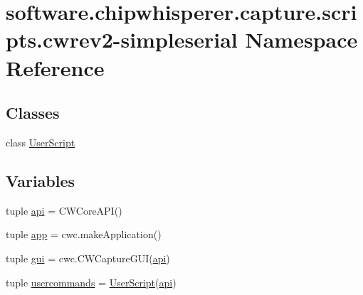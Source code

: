 \hypertarget{namespacesoftware_1_1chipwhisperer_1_1capture_1_1scripts_1_1cwrev2-simpleserial}{}\section{software.\+chipwhisperer.\+capture.\+scripts.\+cwrev2-\/simpleserial Namespace Reference}
\label{namespacesoftware_1_1chipwhisperer_1_1capture_1_1scripts_1_1cwrev2-simpleserial}
\subsection*{Classes}
\begin{DoxyCompactItemize}
\item 
class \hyperlink{classsoftware_1_1chipwhisperer_1_1capture_1_1scripts_1_1cwrev2-simpleserial_1_1UserScript}{User\+Script}
\end{DoxyCompactItemize}
\subsection*{Variables}
\begin{DoxyCompactItemize}
\item 
tuple \hyperlink{namespacesoftware_1_1chipwhisperer_1_1capture_1_1scripts_1_1cwrev2-simpleserial_a36e76f76504a84a1ed68d84e52ce89df}{api} = C\+W\+Core\+A\+P\+I()
\item 
tuple \hyperlink{namespacesoftware_1_1chipwhisperer_1_1capture_1_1scripts_1_1cwrev2-simpleserial_a2d080c6222c227c490bbbf578b071094}{app} = cwc.\+make\+Application()
\item 
tuple \hyperlink{namespacesoftware_1_1chipwhisperer_1_1capture_1_1scripts_1_1cwrev2-simpleserial_ab7992844ddd95ba04f36cd5e2470c863}{gui} = cwc.\+C\+W\+Capture\+G\+U\+I(\hyperlink{namespacesoftware_1_1chipwhisperer_1_1capture_1_1scripts_1_1cwrev2-simpleserial_a36e76f76504a84a1ed68d84e52ce89df}{api})
\item 
tuple \hyperlink{namespacesoftware_1_1chipwhisperer_1_1capture_1_1scripts_1_1cwrev2-simpleserial_a8fcc42cd9e176fb37ab73180811fd7b4}{usercommands} = \hyperlink{classsoftware_1_1chipwhisperer_1_1capture_1_1scripts_1_1cwrev2-simpleserial_1_1UserScript}{User\+Script}(\hyperlink{namespacesoftware_1_1chipwhisperer_1_1capture_1_1scripts_1_1cwrev2-simpleserial_a36e76f76504a84a1ed68d84e52ce89df}{api})
\end{DoxyCompactItemize}


